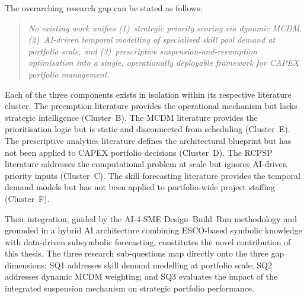 The overarching research gap can be stated as follows:

\begin{quote}
  \textit{No existing work unifies (1)~strategic priority scoring via dynamic MCDM,
  (2)~AI-driven temporal modelling of specialised skill pool demand at portfolio scale, and
  (3)~prescriptive suspension-and-resumption optimisation into a single, operationally
  deployable framework for CAPEX portfolio management.}
\end{quote}

Each of the three components exists in isolation within its respective literature cluster.
The preemption literature provides the operational mechanism but lacks strategic intelligence
(Cluster~B). The MCDM literature provides the prioritisation logic but is static and
disconnected from scheduling (Cluster~E). The prescriptive analytics literature defines the
architectural blueprint but has not been applied to CAPEX portfolio decisions (Cluster~D).
The RCPSP literature addresses the computational problem at scale but ignores AI-driven
priority inputs (Cluster~C). The skill forecasting literature provides the temporal demand
models but has not been applied to portfolio-wide project staffing (Cluster~F).

Their integration, guided by the AI-4-SME Design--Build--Run methodology
\parencite{peter2025ai4sme} and grounded in a hybrid AI architecture combining ESCO-based
symbolic knowledge with data-driven subsymbolic forecasting, constitutes the novel
contribution of this thesis. The three research sub-questions map directly onto the three
gap dimensions: SQ1 addresses skill demand modelling at portfolio scale; SQ2 addresses
dynamic MCDM weighting; and SQ3 evaluates the impact of the integrated suspension mechanism
on strategic portfolio performance.
